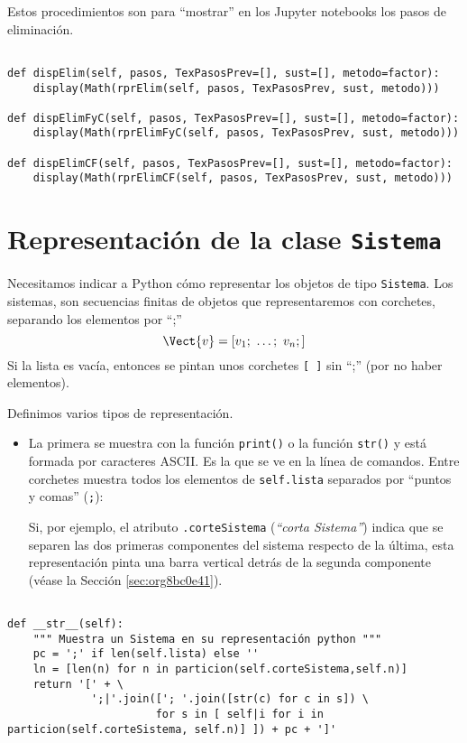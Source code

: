 \documentclass[11pt]{report}
\begin{document}
Estos procedimientos son para ``mostrar'' en los Jupyter notebooks los pasos de eliminación.

\begin{verbatim}

def dispElim(self, pasos, TexPasosPrev=[], sust=[], metodo=factor):
    display(Math(rprElim(self, pasos, TexPasosPrev, sust, metodo)))

def dispElimFyC(self, pasos, TexPasosPrev=[], sust=[], metodo=factor):
    display(Math(rprElimFyC(self, pasos, TexPasosPrev, sust, metodo)))

def dispElimCF(self, pasos, TexPasosPrev=[], sust=[], metodo=factor):
    display(Math(rprElimCF(self, pasos, TexPasosPrev, sust, metodo)))

\end{verbatim}

\section{Representación de la clase \texttt{Sistema}}
\label{sec:orgbc276b7}
Necesitamos indicar a Python cómo representar los objetos de tipo
\texttt{Sistema}. Los sistemas, son secuencias finitas de objetos que
representaremos con corchetes, separando los elementos por ``;''
\begin{displaymath}
  \Vect{v}=[v_1;\ \ldots;\ v_n;]
\end{displaymath}
Si la lista es vacía, entonces se pintan unos corchetes \texttt{[ ]} sin
 ``;'' (por no haber elementos). 

Definimos varios tipos de representación.

\begin{itemize}
\item La primera se muestra con la función \texttt{print()} o la función \texttt{str()}
y está formada por caracteres ASCII. Es la que se ve en la línea de
comandos. Entre corchetes muestra todos los elementos de
\texttt{self.lista} separados por ``puntos y comas'' (\texttt{;}):

Si, por ejemplo, el atributo \texttt{.corteSistema} (\emph{``corta Sistema''}) indica que
se separen las dos primeras componentes del sistema respecto de la
última, esta representación pinta una barra vertical detrás de la
segunda componente (véase la Sección \ref{sec:org8bc0e41}).
\end{itemize}

\begin{verbatim}

def __str__(self):
    """ Muestra un Sistema en su representación python """
    pc = ';' if len(self.lista) else ''
    ln = [len(n) for n in particion(self.corteSistema,self.n)]
    return '[' + \
             ';|'.join(['; '.join([str(c) for c in s]) \
                       for s in [ self|i for i in particion(self.corteSistema, self.n)] ]) + pc + ']'

\end{verbatim}
\end{document}
